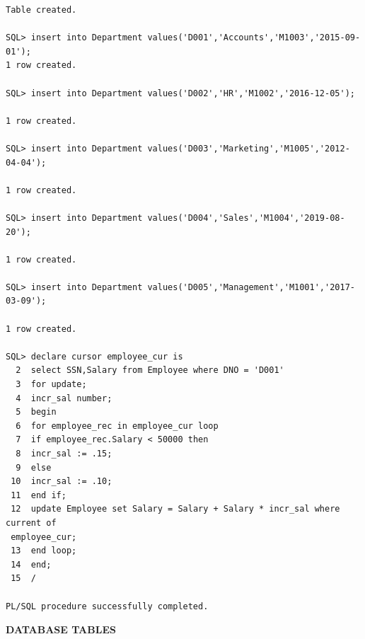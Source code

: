 \documentclass[a4paper,12pt]{report}
\begin{document}
\begin{verbatim}
Table created.

SQL> insert into Department values('D001','Accounts','M1003','2015-09-01');
1 row created.

SQL> insert into Department values('D002','HR','M1002','2016-12-05');

1 row created.

SQL> insert into Department values('D003','Marketing','M1005','2012-04-04');

1 row created.

SQL> insert into Department values('D004','Sales','M1004','2019-08-20');

1 row created.

SQL> insert into Department values('D005','Management','M1001','2017-03-09');

1 row created.

SQL> declare cursor employee_cur is
  2  select SSN,Salary from Employee where DNO = 'D001'
  3  for update;
  4  incr_sal number;
  5  begin
  6  for employee_rec in employee_cur loop
  7  if employee_rec.Salary < 50000 then
  8  incr_sal := .15;
  9  else
 10  incr_sal := .10;
 11  end if;
 12  update Employee set Salary = Salary + Salary * incr_sal where current of
 employee_cur;
 13  end loop;
 14  end;
 15  /

PL/SQL procedure successfully completed.

\end{verbatim}
\begin{flushleft}
\textbf{DATABASE TABLES}
\end{flushleft}
\end{document}

